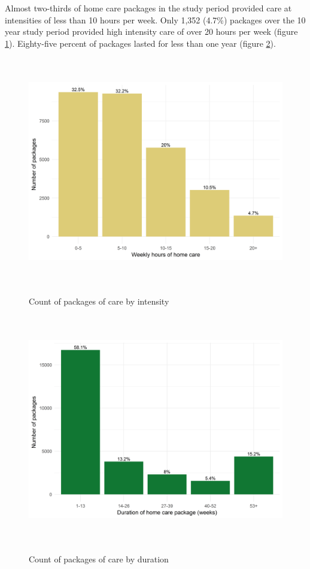 \documentclass[]{article}
\begin{document}
Almost two-thirds of home care packages in the study period provided
care at intensities of less than 10 hours per week. Only 1,352 (4.7\%)
packages over the 10 year study period provided high intensity care of
over 20 hours per week (figure \ref{fig:ren-hrs}). Eighty-five percent
of packages lasted for less than one year (figure
\ref{fig:ren-duration}).

\begin{figure}[h]
  \centering
    \caption{Count of packages of care by intensity}
    \includegraphics[height = 10cm, width = 12cm]{figures/chapter-renf/04-hrs-plot-ts-subset.png}
    \label{fig:ren-hrs}
\end{figure}

\begin{figure}[]
  \centering
    \caption{Count of packages of care by duration}
    \includegraphics[height = 10cm, width = 12cm]{figures/chapter-renf/05-duration-plot.png}
    \label{fig:ren-duration}
\end{figure}
\end{document}
